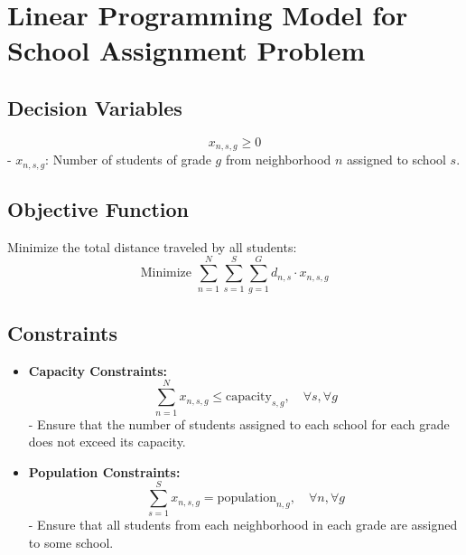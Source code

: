 \documentclass{article}
\begin{document}
\section*{Linear Programming Model for School Assignment Problem}

\subsection*{Decision Variables}
\[
x_{n,s,g} \geq 0
\]
- \( x_{n,s,g} \): Number of students of grade \( g \) from neighborhood \( n \) assigned to school \( s \).

\subsection*{Objective Function}
Minimize the total distance traveled by all students:
\[
\text{Minimize } \sum_{n=1}^{N} \sum_{s=1}^{S} \sum_{g=1}^{G} d_{n,s} \cdot x_{n,s,g}
\]

\subsection*{Constraints}

\begin{itemize}
    \item \textbf{Capacity Constraints:}
    \[
    \sum_{n=1}^{N} x_{n,s,g} \leq \text{capacity}_{s,g}, \quad \forall s, \forall g
    \]
    - Ensure that the number of students assigned to each school for each grade does not exceed its capacity.

    \item \textbf{Population Constraints:}
    \[
    \sum_{s=1}^{S} x_{n,s,g} = \text{population}_{n,g}, \quad \forall n, \forall g
    \]
    - Ensure that all students from each neighborhood in each grade are assigned to some school.
\end{itemize}
\end{document}
